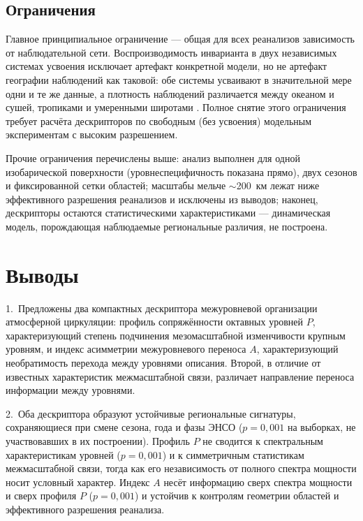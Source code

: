 \documentclass[11pt,a4paper]{article}
\begin{document}
\subsection{Ограничения}

Главное принципиальное ограничение --- общая для всех реанализов зависимость от наблюдательной сети. Воспроизводимость инварианта в двух независимых системах усвоения исключает артефакт конкретной модели, но не артефакт географии наблюдений как таковой: обе системы усваивают в значительной мере одни и те же данные, а плотность наблюдений различается между океаном и сушей, тропиками и умеренными широтами \cite{BonavitaLaloyaux2020,Soci2024}. Полное снятие этого ограничения требует расчёта дескрипторов по свободным (без усвоения) модельным экспериментам с высоким разрешением.

Прочие ограничения перечислены выше: анализ выполнен для одной изобарической поверхности (уровнеспецифичность показана прямо), двух сезонов и фиксированной сетки областей; масштабы мельче $\sim$200~км лежат ниже эффективного разрешения реанализов и исключены из выводов; наконец, дескрипторы остаются статистическими характеристиками --- динамическая модель, порождающая наблюдаемые региональные различия, не построена.

\section{Выводы}
\label{sec:conclusion}

1.~Предложены два компактных дескриптора межуровневой организации атмосферной циркуляции: профиль сопряжённости октавных уровней $P$, характеризующий степень подчинения мезомасштабной изменчивости крупным уровням, и индекс асимметрии межуровневого переноса $A$, характеризующий необратимость перехода между уровнями описания. Второй, в отличие от известных характеристик межмасштабной связи, различает направление переноса информации между уровнями.

2.~Оба дескриптора образуют устойчивые региональные сигнатуры, сохраняющиеся при смене сезона, года и фазы ЭНСО ($p=0{,}001$ на выборках, не участвовавших в их построении). Профиль $P$ не сводится к спектральным характеристикам уровней ($p=0{,}001$) и к симметричным статистикам межмасштабной связи, тогда как его независимость от полного спектра мощности носит условный характер. Индекс $A$ несёт информацию сверх спектра мощности и сверх профиля $P$ ($p=0{,}001$) и устойчив к контролям геометрии областей и эффективного разрешения реанализа.
\end{document}
